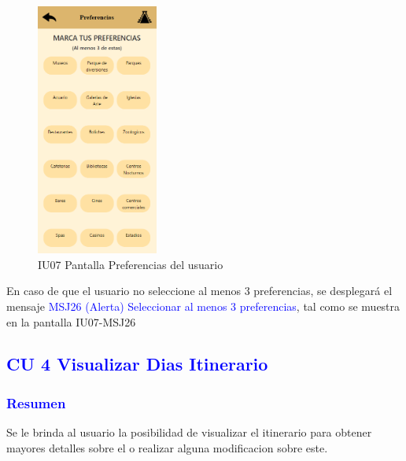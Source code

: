     \begin{figure}[htb]
        \centering
        \includegraphics[width= 4cm]{entregable final/pantallasSistema/IU07 Pantalla Preferencias del usuario.png}
    \caption{IU07 Pantalla Preferencias del usuario}
        \label{fig:enter-label}
    \end{figure}

En caso de que el usuario no seleccione al menos 3 preferencias, se desplegará el mensaje {\textcolor{blue}{MSJ26 (Alerta) Seleccionar al menos 3 preferencias}}, tal como se muestra en la pantalla IU07-MSJ26
    

\pagebreak
\subsection{\textcolor{blue}{CU 4 Visualizar Dias Itinerario}}

\subsubsection{\textcolor{blue}{Resumen}}
Se le brinda al usuario la posibilidad de visualizar el itinerario para obtener mayores detalles sobre el o realizar alguna modificacion sobre este.
